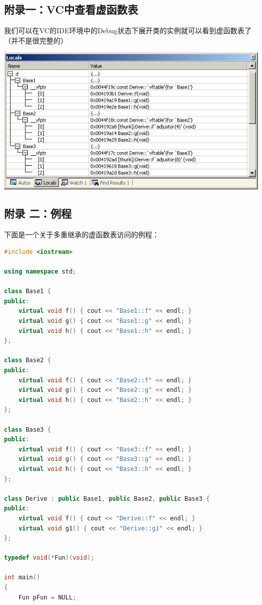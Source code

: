 \documentclass{article}
\begin{document}
\begin{CJK}{UTF8}{gbsn}
\begin{description}
\subsection{附录一：VC中查看虚函数表}

我们可以在VC的IDE环境中的Debug状态下展开类的实例就可以看到虚函数表了（并不是很完整的）

\includegraphics{m9.JPG}

\subsection{附录 二：例程}

下面是一个关于多重继承的虚函数表访问的例程：
\begin{lstlisting}[language=c++] 
#include <iostream>

using namespace std;
 
class Base1 {
public:
    virtual void f() { cout << "Base1::f" << endl; }
    virtual void g() { cout << "Base1::g" << endl; }
    virtual void h() { cout << "Base1::h" << endl; }
};
 
class Base2 {
public:
    virtual void f() { cout << "Base2::f" << endl; }
    virtual void g() { cout << "Base2::g" << endl; }
    virtual void h() { cout << "Base2::h" << endl; }
};
 
class Base3 {
public:
    virtual void f() { cout << "Base3::f" << endl; }
    virtual void g() { cout << "Base3::g" << endl; }
    virtual void h() { cout << "Base3::h" << endl; }
};
 
class Derive : public Base1, public Base2, public Base3 {
public:
    virtual void f() { cout << "Derive::f" << endl; }
    virtual void g1() { cout << "Derive::g1" << endl; }
};
 
typedef void(*Fun)(void);
 
int main()
{
    Fun pFun = NULL;
 

\end{lstlisting}
\end{description}
\end{CJK}
\end{document}
